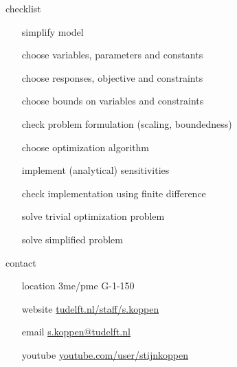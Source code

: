 \documentclass[aspectratio=169]{beamer}
\begin{document}
\begin{frame}{checklist}

\begin{center}
\begin{minipage}[c]{.7\textwidth}
\begin{itemize}
    \item[\checkmark] simplify model
    \pause
    \item[\checkmark] choose variables, parameters and constants
    \pause
    \item[\checkmark] choose responses, objective and constraints
    \pause
    \item[\checkmark] choose bounds on variables and constraints
    \pause
    \item[\checkmark] check problem formulation (scaling, boundedness)
    \pause
    \item[\checkmark] choose optimization algorithm
    \pause
    \item[\checkmark] implement (analytical) sensitivities
    \pause
    \item[\checkmark] check implementation using finite difference
    \pause
    \item[\checkmark] solve trivial optimization problem
    \pause
    \item[\checkmark] solve simplified problem
\end{itemize}
\end{minipage}
\end{center}
    
\end{frame}



\begin{frame}{contact}

\centering
\begin{minipage}[c]{.45\textwidth}
    \begin{itemize}
    \item[location] 3me/pme G-1-150
    \item[website] \href{https://www.tudelft.nl/staff/s.koppen/}{tudelft.nl/staff/s.koppen}
        \item[email] \href{mailto:s.koppen@tudelft.nl}{s.koppen@tudelft.nl}
        \item[youtube] \href{http://www.youtube.com/user/stijnkoppen}{youtube.com/user/stijnkoppen}
    \end{itemize}
\end{minipage}

\end{frame}
\end{document}
